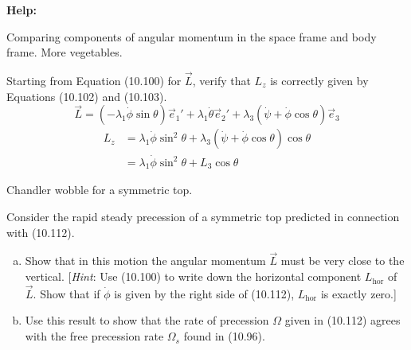 \documentclass[11pt,letterpaper,boxed]{../hmcpsetrhino}
\begin{document}
\textbf{Help:}

\begin{problem}[i]
Comparing components of angular momentum in the space frame and body frame. More vegetables.

\begin{problem}[10.49]
Starting from Equation (10.100) for $\vec L$, verify that $L_z$ is correctly given by Equations (10.102) and (10.103).\\
\[	\vec L = (-\lambda_1 \dot \phi \sin \theta) \vec e_1'  + \lambda_1 \dot \theta \vec e_2' + \lambda_3 (\dot \psi + \dot \phi \cos \theta) \vec e_3 \tag{10.100}\]
\begin{align*}
L_z &= \lambda_1 \dot \phi \sin^2 \theta + \lambda_3(\dot \psi + \dot \phi \cos \theta) \cos \theta \tag{10.102}\\
&= \lambda_1 \dot \phi \sin^2 \theta + L_3 \cos \theta \tag{10.103}
\end{align*}
\end{problem}
\end{problem}
\begin{solution}


\vfill
\end{solution}

\newpage 

\begin{problem}[ii]
Chandler wobble for a symmetric top.

\begin{problem}[10.52]
Consider the rapid steady precession of a symmetric top predicted in connection with (10.112).
\begin{enumerate}[(a)]
\item Show that in this motion the angular momentum $\vec L$ must be very close to the vertical. [\textit{Hint}: Use (10.100) to write down the horizontal component $L_{\text{hor}}$ of $\vec L$. Show that if $\dot \phi$ is given by the right side of (10.112), $L_{\text{hor}}$ is exactly zero.]

\item Use this result to show that the rate of precession $\Omega$ given in (10.112) agrees with the free precession rate $\Omega_s$ found in (10.96).

\end{enumerate}
\end{problem}
\end{problem}
\begin{solution}


\vfill
\end{solution}
\end{document}
